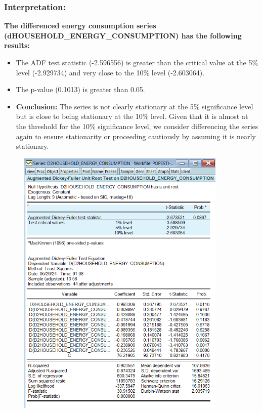 \documentclass{article} %
\begin{document}
\subsubsection*{Interpretation:}
\textbf{The differenced energy consumption series (dHOUSEHOLD\_ENERGY\_CONSUMPTION) has the following results:}
\begin{itemize}
    \item The ADF test statistic (-2.596556) is greater than the critical value at the 5\% level (-2.929734) and very close to the 10\% level (-2.603064).
    \item The p-value (0.1013) is greater than 0.05.
    \item \textbf{Conclusion:} The series is not clearly stationary at the 5\% significance level but is close to being stationary at the 10\% level. Given that it is almost at the threshold for the 10\% significance level, we consider differencing the series again to ensure stationarity or proceeding cautiously by assuming it is nearly stationary.
\end{itemize}

\begin{figure}[H]
    \centering
    \includegraphics[width=10cm]{images/image29.png}
\end{figure}

\pagebreak
\end{document}
